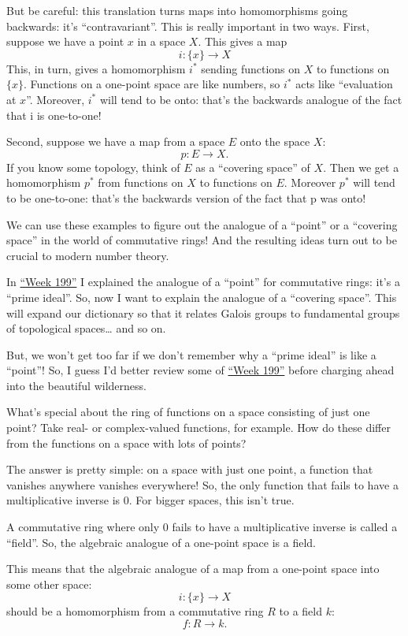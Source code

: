 \documentclass{article}
\begin{document}
But be careful: this translation turns maps into homomorphisms going
backwards: it's ``contravariant''. This is really important in two ways.
First, suppose we have a point \(x\) in a space \(X\). This gives a map
\[i\colon \{x\} \to X\] This, in turn, gives a homomorphism \(i^*\)
sending functions on \(X\) to functions on \(\{x\}\). Functions on a
one-point space are like numbers, so \(i^*\) acts like ``evaluation at
\(x\)''. Moreover, \(i^*\) will tend to be onto: that's the backwards
analogue of the fact that i is one-to-one!

Second, suppose we have a map from a space \(E\) onto the space \(X\):
\[p\colon E \to X.\] If you know some topology, think of \(E\) as a
``covering space'' of \(X\). Then we get a homomorphism \(p^*\) from
functions on \(X\) to functions on \(E\). Moreover \(p^*\) will tend to
be one-to-one: that's the backwards version of the fact that p was onto!

We can use these examples to figure out the analogue of a ``point'' or a
``covering space'' in the world of commutative rings! And the resulting
ideas turn out to be crucial to modern number theory.

In \protect\hyperlink{week199}{``Week 199''} I explained the analogue of
a ``point'' for commutative rings: it's a ``prime ideal''. So, now I
want to explain the analogue of a ``covering space''. This will expand
our dictionary so that it relates Galois groups to fundamental groups of
topological spaces\ldots{} and so on.

But, we won't get too far if we don't remember why a ``prime ideal'' is
like a ``point''! So, I guess I'd better review some of
\protect\hyperlink{week199}{``Week 199''} before charging ahead into the
beautiful wilderness.

What's special about the ring of functions on a space consisting of just
one point? Take real- or complex-valued functions, for example. How do
these differ from the functions on a space with lots of points?

The answer is pretty simple: on a space with just one point, a function
that vanishes anywhere vanishes everywhere! So, the only function that
fails to have a multiplicative inverse is \(0\). For bigger spaces, this
isn't true.

A commutative ring where only \(0\) fails to have a multiplicative
inverse is called a ``field''. So, the algebraic analogue of a one-point
space is a field.

This means that the algebraic analogue of a map from a one-point space
into some other space: \[i\colon \{x\} \to X\] should be a homomorphism
from a commutative ring \(R\) to a field \(k\): \[f\colon R \to k.\]
\end{document}

